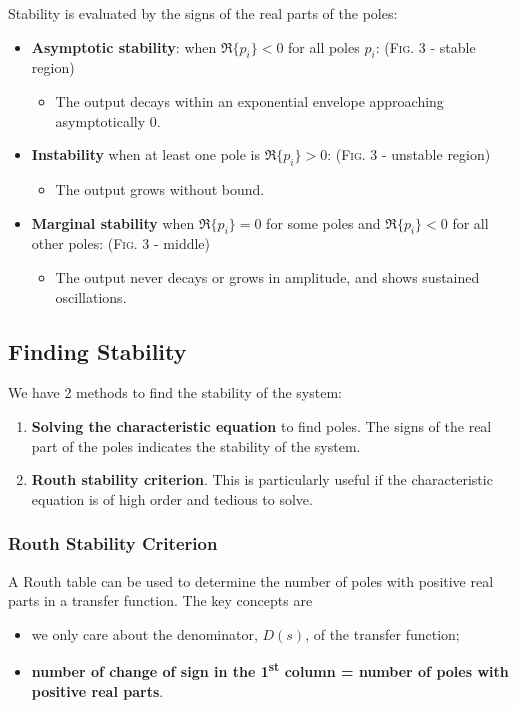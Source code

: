 Stability is evaluated by the signs of the real parts of the poles:
\begin{itemize}
    \item \textbf{Asymptotic stability}: when $\Re\{p_{i}\} < 0 $ for all poles $p_{i}$: (\textsc{Fig. 3} - stable region)
        \begin{itemize}
            \item The output decays within an exponential envelope approaching asymptotically 0. 
        \end{itemize}
        
    \item \textbf{Instability} when at least one pole is $\Re\{p_{i}\} >0$: (\textsc{Fig. 3} - unstable region)
        \begin{itemize}
            \item The output grows without bound. 
        \end{itemize}
        
    \item \textbf{Marginal stability} when $\Re\{p_{i}\} =0$ for some poles and $\Re\{p_{i}\} <0$ for all other poles: (\textsc{Fig. 3} - middle)
        \begin{itemize}
            \item The output never decays or grows in amplitude, and shows sustained oscillations. 
        \end{itemize}
\end{itemize}

\subsection{Finding Stability}
We have 2 methods to find the stability of the system:
\begin{enumerate}
    \item \textbf{Solving the characteristic equation} to find poles. The signs of the real part of the poles indicates the stability of the system.
    \item \textbf{Routh stability criterion}. This is particularly useful if the characteristic equation is of high order and tedious to solve.
\end{enumerate}
\subsubsection{Routh Stability Criterion}
A Routh table can be used to determine the number of poles with positive real parts in a transfer function. The key concepts are
\begin{itemize}
    \item we only care about the denominator, $D(s)$, of the transfer function;
    \item \textbf{number of change of sign in the 1\textsuperscript{st} column = number of poles with positive real parts}.
\end{itemize}
